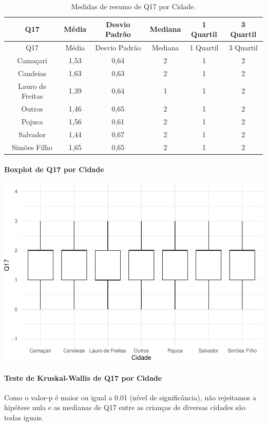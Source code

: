 \documentclass[]{article}
\let\oldparagraph\paragraph
\renewcommand{\paragraph}[1]{\oldparagraph{#1}\mbox{}}
\begin{document}
\begin{longtable}[]{@{}cccccc@{}}
\caption{\label{tab:unnamed-chunk-194}Medidas de resumo de Q17 por Cidade.}\tabularnewline
\toprule
Q17 & Média & Desvio Padrão & Mediana & 1 Quartil & 3 Quartil\tabularnewline
\midrule
\endfirsthead
\toprule
Q17 & Média & Desvio Padrão & Mediana & 1 Quartil & 3 Quartil\tabularnewline
\midrule
\endhead
Camaçari & 1,53 & 0,64 & 2 & 1 & 2\tabularnewline
Candeias & 1,63 & 0,63 & 2 & 1 & 2\tabularnewline
Lauro de Freitas & 1,39 & 0,64 & 1 & 1 & 2\tabularnewline
Outros & 1,46 & 0,65 & 2 & 1 & 2\tabularnewline
Pojuca & 1,56 & 0,61 & 2 & 1 & 2\tabularnewline
Salvador & 1,44 & 0,67 & 2 & 1 & 2\tabularnewline
Simões Filho & 1,65 & 0,65 & 2 & 1 & 2\tabularnewline
\bottomrule
\end{longtable}

\hypertarget{boxplot-de-q17-por-cidade}{%
\paragraph{Boxplot de Q17 por Cidade}\label{boxplot-de-q17-por-cidade}}

\begin{center}\includegraphics[width=0.75\linewidth]{relatorio_covid19_files/figure-latex/unnamed-chunk-195-1} \end{center}

\hypertarget{teste-de-kruskal-wallis-de-q17-por-cidade}{%
\paragraph{Teste de Kruskal-Wallis de Q17 por Cidade}\label{teste-de-kruskal-wallis-de-q17-por-cidade}}

Como o valor-p é maior ou igual a 0.01 (nível de significância), não rejeitamos a hipótese nula e as medianas de Q17 entre as crianças de diversas cidades são todas iguais.
\end{document}

